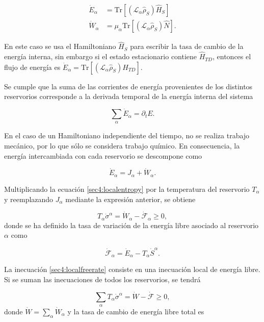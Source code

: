 \begin{align*}
    \dot{E}_{\alpha} & = \text{Tr}[ (\mathcal{L}_{\alpha} \hat{\rho}_{S}) \hat{H}_{S}] \\
    \dot{W}_{\alpha} & = \mu_{\alpha}\text{Tr}[ (\mathcal{L}_{\alpha} \hat{\rho}_{S}) \hat{N}].
\end{align*}

En este caso se usa el Hamiltoniano $\hat{H}_{S}$ para escribir la tasa de cambio de la energía interna, sin embargo si el estado estacionario contiene $\hat{H}_{TD}$, entonces el flujo de energía es $ \dot{E}_{\alpha} = \text{Tr}[ (\mathcal{L}_{\alpha} \hat{\rho}_{S}) \hat{H}_{TD}]$.

Se cumple que la suma de las corrientes de energía provenientes de los distintos reservorios corresponde a la derivada temporal de la energía interna del sistema

\begin{equation*}
    \sum_{\alpha}\dot{E}_{\alpha} = \partial_{t}E.
\end{equation*}

En el caso de un Hamiltoniano independiente del tiempo, no se realiza trabajo mecánico, por lo que sólo se considera trabajo químico. En consecuencia, la energía intercambiada con cada reservorio se descompone como

\begin{equation*}
    \dot{E}_{\alpha} = J_{\alpha} + \dot{W}_{\alpha}.
\end{equation*}

Multiplicando la ecuación \ref{sec4:localentropy} por la temperatura del reservorio $T_{\alpha}$ y reemplazando $J_{\alpha}$ mediante la expresión anterior, se obtiene

\begin{equation}
    T_{\alpha} \dot{\sigma}^{\alpha} = \dot{W}_{\alpha} - \dot{\mathcal{F}}_{\alpha} \geq 0,
\label{sec4:localfreerate}
\end{equation}
donde se ha definido la tasa de variación de la energía libre asociado al reservorio $\alpha$ como 

\begin{equation*}
    \dot{\mathcal{F}}_{\alpha} = \dot{E}_{\alpha} - T_{\alpha}\dot{S}^{\alpha}.
\end{equation*}

La inecuación \ref{sec4:localfreerate} consiste en una inecuación local de energía libre. Si se suman las inecuaciones de todos los reservorios, se tendrá 

\begin{equation}
    \sum_{\alpha}T_{\alpha} \dot{\sigma}^{\alpha} = \dot{W} - \dot{\mathcal{F}} \geq 0,
\label{sec4:freeratefinal}
\end{equation}
donde $\dot{W} = \sum_{\alpha}\dot{W}_{\alpha}$ y la tasa de cambio de energía libre total es

